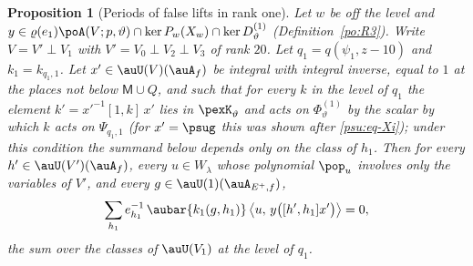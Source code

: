 \documentclass[10pt]{amsart}
\newtheorem{proposition}[theorem]{Proposition}
\theoremstyle{definition}
\theoremstyle{remark}
\begin{document}
\begin{proposition}[Periods of false lifts in rank one]\label{psu:periods}
Let $w$ be off the level and $y\in\varrho(e_1)\poA(V;p,\vartheta)\cap\ker P_w(X_w)\cap\ker
D^{(1)}_\vartheta$ (Definition~\ref{po:R3}). Write $V=V'\perp V_1$ with $V'=V_0\perp V_2\perp V_3$ of
rank $20$. Let $q_1=q(\psi_1,z-10)$ and $k_1=k_{q_1,1}$. Let $x'\in\auU(V)(\auA_f)$ be integral with
integral inverse, equal to $1$ at the places not below $\mathsf M\cup Q$, and such that for every $k$ in
the level of $q_1$ the element $k'=x'^{-1}[1,k]\,x'$ lies in $\pexK_\vartheta$ and acts on
$\Phi^{(1)}_\vartheta$ by the scalar by which $k$ acts on $\Psi_{q_1,1}$ (for $x'=\psug$ this was shown
after \eqref{psu:eq-Xi}); under this condition the summand below depends only on the class of $h_1$.
Then for every $h'\in\auU(V')(\auA_f)$, every
$u\in W_\lambda$ whose polynomial $\pop_u$ involves only the variables of $V'$, and every
$g\in\auU(1)(\auA_{E^+,f})$,
\[
\sum_{h_1}e_{h_1}^{-1}\,\aubar{k_1(g,h_1)}\,\bigl\langle u,\,y\bigl([h',h_1]x'\bigr)\bigr\rangle=0,
\]
the sum over the classes of $\auU(V_1)$ at the level of $q_1$.
\end{proposition}
\end{document}
